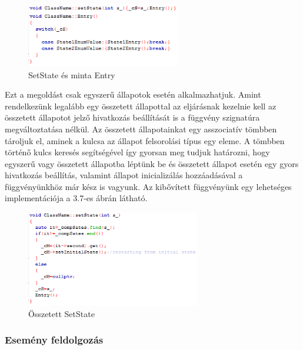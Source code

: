 \documentclass[a4paper,12pt]{report}
\begin{document}
\begin{figure}[hbtp]
\centering
\includegraphics[width=0.6\textwidth]{stent.png}
\caption{SetState és minta Entry}
\label{fig:stmn}
\end{figure}

Ezt a megoldást csak egyszerű állapotok esetén alkalmazhatjuk. Amint rendelkezünk legalább egy összetett állapottal az eljárásnak kezelnie kell az összetett állapotot jelző hivatkozás beállítását is a függvény szignatúra megváltoztatása nélkül.
Az összetett állapotainkat egy asszociatív tömbben tároljuk el, aminek a kulcsa az állapot felsorolási típus egy eleme. A tömbben történő kulcs keresés segítségével így gyorsan meg tudjuk határozni, hogy egyszerű vagy összetett állapotba léptünk be és összetett állapot esetén egy gyors hivatkozás beállítás, valamint állapot inicializálás hozzáadásával a függvényünkhöz már kész is vagyunk. Az kibővített függvényünk egy lehetséges implementációja a 3.7-es ábrán látható.

\pagebreak 

\begin{figure}[hbtp]
\centering
\includegraphics[width=0.68\textwidth]{setsos.png}
\caption{Összetett SetState}
\label{fig:ostmn}
\end{figure}

\subsubsection{Esemény feldolgozás}
\end{document}

